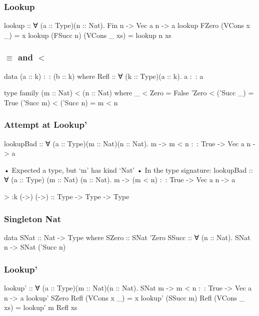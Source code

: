\documentclass{beamer}
\begin{document}
\begin{frame}[fragile]\frametitle{Lookup}
\begin{semiverbatim}
lookup :: ∀ (a :: Type)(n :: Nat). Fin n -> Vec a n -> a
lookup FZero     (VCons x _)  = x
lookup (FSucc n) (VCons _ xs) = lookup n xs
\end{semiverbatim}
\end{frame}

\begin{frame}[fragile]\frametitle{$\equiv$ and $<$}
\begin{semiverbatim}
data (a :: k) :~: (b :: k) where
  Refl :: ∀ (k :: Type)(a :: k). a :~: a

type family (m :: Nat) < (n :: Nat) where
  _         < Zero      = False
  'Zero     < ('Succ _) = True
  ('Succ m) < ('Succ n) = m < n
\end{semiverbatim}
\end{frame}

\begin{frame}[fragile]\frametitle{Attempt at Lookup'}
\begin{semiverbatim}
lookupBad :: ∀ (a :: Type)(m :: Nat)(n :: Nat).
             m -> m < n :~: True -> Vec a n -> a

  • Expected a type, but ‘m’ has kind ‘Nat’
  • In the type signature:
      lookupBad :: ∀ (a :: Type) (m :: Nat) (n :: Nat).
                   m -> (m < n) :~: True -> Vec a n -> a

> :k (->)
(->) :: Type -> Type -> Type
\end{semiverbatim}
\end{frame}

\begin{frame}[fragile]\frametitle{Singleton Nat}
\begin{semiverbatim}
data SNat :: Nat -> Type where
  SZero :: SNat 'Zero
  SSucc :: ∀ (n :: Nat). SNat n -> SNat ('Succ n)
\end{semiverbatim}
\end{frame}

\begin{frame}[fragile]\frametitle{Lookup'}
\begin{semiverbatim}
lookup' :: ∀ (a :: Type)(m :: Nat)(n :: Nat).
           SNat m -> m < n :~: True -> Vec a n -> a
lookup' SZero     Refl (VCons x _)  = x
lookup' (SSucc m) Refl (VCons _ xs) = lookup' m Refl xs
\end{semiverbatim}
\end{frame}
\end{document}
